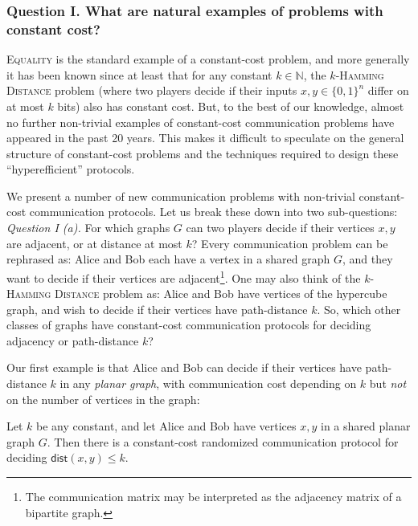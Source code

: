 \documentclass{theoretics}
\newcommand{\dist}{\mathsf{dist}}
\newcommand{\zo}{\{0,1\}}
\newcommand{\bN}{\ensuremath{\mathbb{N}}}
\begin{document}
\subsubsection*{Question I. What are natural examples of problems with constant cost?}

\textsc{Equality} is the
standard example of a constant-cost problem, and more generally it has been known since at least
\cite{Yao03} that for any constant $k \in \bN$, the \textsc{$k$-Hamming Distance} problem (where two players
decide if their inputs $x,y \in \zo^n$ differ on at most $k$ bits) also has constant cost. But, to
the best of our knowledge, almost no further non-trivial examples of constant-cost communication problems
have appeared in the past 20 years. This makes it difficult to speculate on the general structure of
constant-cost problems and the techniques required to design these ``hyperefficient'' protocols.

We present a number of new communication problems with non-trivial constant-cost communication
protocols. Let us break these down into two sub-questions:\\

\noindent
\emph{Question I (a).} For which graphs $G$ can two players decide if their vertices $x,y$ are
adjacent, or at distance at most $k$? Every communication problem can be rephrased as: Alice and Bob
each have a vertex in a shared graph $G$, and they want to decide if their vertices are
adjacent\footnote{The communication matrix may be interpreted as the adjacency matrix of a bipartite
graph.}. One may also think of the \textsc{$k$-Hamming Distance} problem as: Alice and Bob have
vertices of the hypercube graph, and wish to decide if their vertices have path-distance $k$. So,
which other classes of graphs have constant-cost communication protocols for deciding
adjacency or path-distance $k$?

Our first example is that Alice and Bob can decide if their vertices have path-distance $k$ in any
\emph{planar graph}, with communication cost depending on $k$ but \emph{not} on the number of
vertices in the graph:

\begin{theorem}
\label{thm:intro-planar}
Let $k$ be any constant, and let Alice and Bob have vertices $x,y$ in a shared planar graph $G$.
Then there is a constant-cost randomized communication protocol for deciding $\dist(x,y) \leq k$.
\end{theorem}
\end{document}
